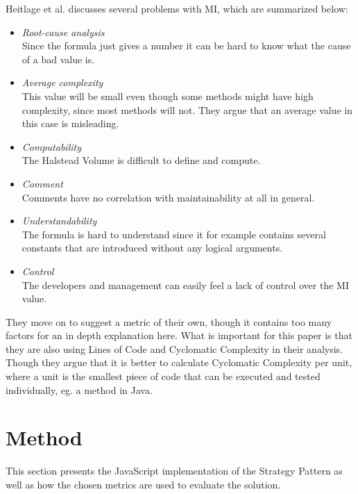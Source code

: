 \documentclass[conference, a4paper]{IEEEtran}
\begin{document}
Heitlage et al. discusses several problems with MI, which are summarized below:
\begin{itemize}
    \item \emph{Root-cause analysis} \\
    Since the formula just gives a number it can be hard to know what the cause of a bad value is.
    \item \emph{Average complexity} \\
    This value will be small even though some methods might have high complexity, since most methods will not. They argue that an average value in this case is misleading.
    \item \emph{Computability} \\
		The Halstead Volume is difficult to define and compute.
    \item \emph{Comment} \\
		Comments have no correlation with maintainability at all in general.
    \item \emph{Understandability} \\
		The formula is hard to understand since it for example contains several constants that are introduced without any logical arguments.
		\item \emph{Control} \\
		The developers and management can easily feel a lack of control over the MI value.
\end{itemize}
They move on to suggest a metric of their own, though it contains too many factors for an in depth explanation here. What is important for this paper is that they are also using Lines of Code and Cyclomatic Complexity in their analysis. Though they argue that it is better to calculate Cyclomatic Complexity per unit, where a unit is the smallest piece of code that can be executed and tested individually, eg. a method in Java.~\cite{bibitem:Maintainability}

\section{Method}
This section presents the JavaScript implementation of the Strategy Pattern as well as how the chosen metrics are used to evaluate the solution.
\end{document}
